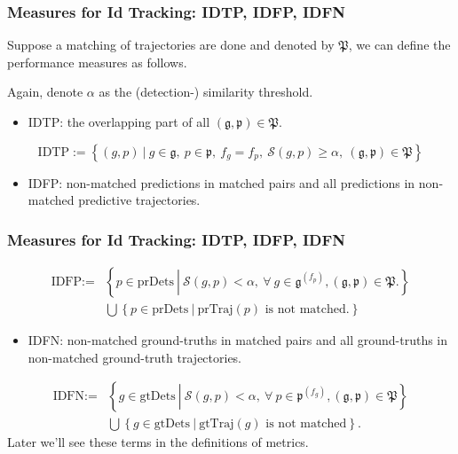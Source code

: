 \documentclass[slidetop, mathserif]{beamer}
\begin{document}
\begin{frame}
	\frametitle{Measures for Id Tracking: IDTP, IDFP, IDFN}
			
	Suppose a matching of trajectories are done and denoted by $\mathfrak P$,
	we can define the performance measures as follows.
			
	\vspace{4pt}
			
	Again, denote $\alpha$ as the (detection-) similarity threshold.
	\begin{itemize}
		\item IDTP:
		      the overlapping part of all $(\mathfrak g, \mathfrak p) \in \mathfrak P$.
	\end{itemize}
			
	\vspace{-15pt}
	\[
		\text{IDTP} := \left\{ (g,p)\ |\ 
		g\in\mathfrak g, ~ p\in\mathfrak p, ~
		f_g=f_p, ~ 
		\mathcal S(g,p) \geq \alpha, ~ 
		(\mathfrak g, \mathfrak p)\in\mathfrak P
		\right\}
	\]
	\vspace{-10pt}
	\begin{itemize}
		\item IDFP:
		      non-matched predictions in matched pairs
		      and all predictions in non-matched predictive trajectories.
	\end{itemize}
			    
\end{frame}

\begin{frame}
	\frametitle{Measures for Id Tracking: IDTP, IDFP, IDFN}
			    
	\vspace{-10pt}
		
	\begin{align*}
		\text{IDFP} := & \left\{ p\in\text{prDets}\ \left|\                                                
		\mathcal S(g,p)<\alpha, \ 
		\forall\ g\in\mathfrak g^{(f_p)},
		(\mathfrak g,\mathfrak p)\in\mathfrak P.
		\right.
		\right\} \\
		               & \bigcup \left\{p \in \text{prDets}\ |\ \text{prTraj$(p)$ is not matched.}\right\} 
	\end{align*}
			
	\vspace{-10pt}
	\begin{itemize}
		\item IDFN:
		      non-matched ground-truths in matched pairs and
		      all ground-truths in non-matched ground-truth trajectories.
	\end{itemize}
	\begin{align*}
		\text{IDFN} := & \left\{ g\in\text{gtDets}\ \left|\                                                
		\mathcal S(g,p)<\alpha, \ 
		\forall\ p\in\mathfrak p^{(f_g)},
		(\mathfrak g,\mathfrak p)\in\mathfrak P
		\right.
		\right\} \\
		               & \bigcup \left\{g \in \text{gtDets}\ |\ \text{gtTraj$(g)$ is not matched}\right\}. 
	\end{align*}
	Later we'll see these terms in the definitions of metrics.
\end{frame}
\end{document}
